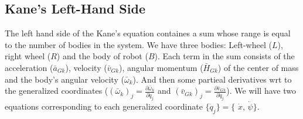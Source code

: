\documentclass[a4paper,10pt]{article}
\begin{document}
\subsection{Kane's Left-Hand Side}
The left hand side of the Kane's equation containes a sum whose range is equal to the number of bodies
in the system. We have three bodies: Left-wheel ($L$), right wheel ($R$) and the body of robot ($B$). 
Each term in the sum consists of the acceleration ($\bar{a}_{Gk}$), velocity ($\bar{v}_{Gk}$), 
angular momentum ($\bar{H}_{Gk}$) of the center of mass and the body's angular velocity ($\bar{\omega}_k$). 
And then some partieal derivatives wrt to the generalized coordinates 
($(\bar{\omega}_k)_j=\frac{\partial \bar{\omega}_k}{\partial \dot{q}_j}$ and 
$(\bar{v}_{Gk})_j=\frac{\partial \bar{v}_{Gk}}{\partial \dot{q}_j}$). We will have two equations 
corresponding to each generalized coordinate $\{\dot{q}_j\} = \{$ $\dot{x}$, $\dot{\psi} \}$.
\end{document}
